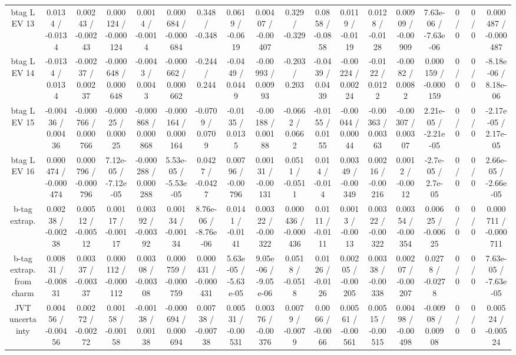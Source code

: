 \documentclass[10pt]{article}
\begin{document}
\begin{table}[htbp]
\begin{center}
\begin{tabular}{|c|c|c|c|c|c|c|c|c|c|c|c|c|c|c|c|c|c|}
  btag L EV 13 & 0.0134 / -0.0134 & 0.00243 / -0.00243 & 0.000124 / -0.000124 & 0.0014 / -0.0014 & 0.000684 / -0.000684 & 0.348 / -0.348 & 0.0619 / -0.0619 & 0.00407 / -0.00407 & 0.329 / -0.329 & 0.0858 / -0.0858 & 0.0119 / -0.0119 & 0.0128 / -0.0128 & 0.00909 / -0.00909 & 7.63e-06 / -7.63e-06 & 0 / 0 & 0 / 0 & 0.000487 / -0.000487 \\ 
  btag L EV 14 & -0.0134 / 0.0134 & -0.00237 / 0.00237 & -0.000648 / 0.000648 & -0.0043 / 0.0043 & -0.000662 / 0.000662 & -0.244 / 0.244 & -0.0449 / 0.0449 & -0.00993 / 0.00993 & -0.203 / 0.203 & -0.0439 / 0.0439 & -0.00224 / 0.00224 & -0.0122 / 0.0122 & -0.0082 / 0.0082 & 0.000159 / -0.000159 & 0 / 0 & 0 / 0 & -8.18e-06 / 8.18e-06 \\ 
  btag L EV 15 & -0.00436 / 0.00436 & -0.000766 / 0.000766 & -0.00025 / 0.00025 & -0.000868 / 0.000868 & -0.000164 / 0.000164 & -0.0709 / 0.0709 & -0.0135 / 0.0135 & -0.00188 / 0.00188 & -0.0662 / 0.0662 & -0.0155 / 0.0155 & -0.00044 / 0.00044 & -0.00363 / 0.00363 & -0.00307 / 0.00307 & 2.21e-05 / -2.21e-05 & 0 / 0 & 0 / 0 & -2.17e-05 / 2.17e-05 \\ 
  btag L EV 16 & 0.000474 / -0.000474 & 0.000796 / -0.000796 & 7.12e-05 / -7.12e-05 & -0.000288 / 0.000288 & 5.53e-05 / -5.53e-05 & 0.0427 / -0.0427 & 0.00796 / -0.00796 & 0.00131 / -0.00131 & 0.0511 / -0.0511 & 0.014 / -0.014 & 0.00349 / -0.00349 & 0.00216 / -0.00216 & 0.0012 / -0.0012 & -2.7e-05 / 2.7e-05 & 0 / 0 & 0 / 0 & 2.66e-05 / -2.66e-05 \\ 
  b-tag extrap. & 0.00238 / -0.00238 & 0.00512 / -0.00512 & 0.00117 / -0.00117 & 0.00392 / -0.00392 & 0.00134 / -0.00134 & 8.76e-06 / -8.76e-06 & 0.0141 / -0.0141 & 0.00322 / -0.00322 & 0.000436 / -0.000436 & 0.0111 / -0.0111 & 0.0013 / -0.0013 & 0.00322 / -0.00322 & 0.00354 / -0.00354 & 0.00625 / -0.00625 & 0 / 0 & 0 / 0 & 0.000711 / -0.000711 \\ 
  b-tag extrap. from charm & 0.00831 / -0.00831 & 0.00337 / -0.00337 & 0.000112 / -0.000112 & 0.00308 / -0.00308 & 0.000759 / -0.000759 & 0.000431 / -0.000431 & 5.63e-05 / -5.63e-05 & 9.05e-06 / -9.05e-06 & 0.0518 / -0.0518 & 0.0126 / -0.0126 & 0.00205 / -0.00205 & 0.00338 / -0.00338 & 0.00207 / -0.00207 & 0.0278 / -0.0278 & 0 / 0 & 0 / 0 & 7.63e-05 / -7.63e-05 \\ 
  JVT uncertainty & 0.00456 / -0.00456 & 0.00272 / -0.00272 & 0.00158 / -0.00158 & -0.00138 / 0.00138 & -0.000694 / 0.000694 & 0.00738 / -0.00738 & 0.00531 / -0.00531 & 0.00376 / -0.00376 & 0.0079 / -0.0079 & 0.0066 / -0.0066 & 0.00561 / -0.00561 & 0.00515 / -0.00515 & 0.00498 / -0.00498 & -0.00908 / 0.00908 & 0 / 0 & 0 / 0 & 0.00524 / -0.00524 \\ 

\end{tabular}
\end{center}
\end{table}
\end{document}
